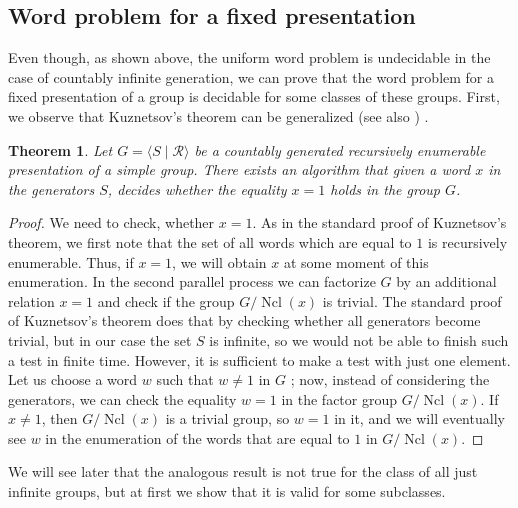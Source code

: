 \documentclass[12pt,a4paper]{amsart}
\newtheorem{theorem}{Theorem}
\DeclareMathOperator{\Ncl}{Ncl}
\begin{document}
\subsection{Word problem for a fixed presentation} Even though, as shown above, the uniform word problem is undecidable in the case of countably infinite generation, we can prove that the word problem for a fixed presentation of a group is decidable for some classes of these groups. First, we observe that Kuznetsov's theorem can be generalized (see also \cite[Proposition 3.2]{BBMZ2025}) .

\begin{theorem}
\label{cg_s_theorem}
    Let $G=\langle S \mid \mathcal{R} \rangle$ be a countably generated recursively enumerable presentation of a simple group. There exists an algorithm that given a word $x$ in the generators $S$, decides whether the equality $x=1$ holds in the group $G$.
\end{theorem}
\begin{proof}
We need to check, whether $x=1$. As in the standard proof of Kuznetsov's theorem, we first note that the set of all words which are equal to $1$ is recursively enumerable. Thus, if $x=1$, we will obtain $x$ at some moment of this enumeration. In the second parallel process we can factorize $G$ by an additional relation $x=1$ and check if the group $G/\Ncl(x)$ is trivial. The standard proof of Kuznetsov's theorem does that by checking whether all generators become trivial, but in our case the set $S$ is infinite, so we would not be able to finish such a test in finite time. However, it is sufficient to make a test with just one element. Let us choose a word $w$ such that $w\ne 1$ in $G$
; now, instead of considering the generators, we can check the equality $w=1$ in the factor group $G/\Ncl(x)$. If $x\ne 1$, then $G/\Ncl(x)$ is a trivial group, so $w=1$ in it, and we will eventually see $w$ in the enumeration of the words that are equal to $1$ in $G/\Ncl(x)$.
\end{proof}

We will see later that the analogous result is not true for the class of all just infinite groups, but at first we show that it is valid for some subclasses.
\end{document}
